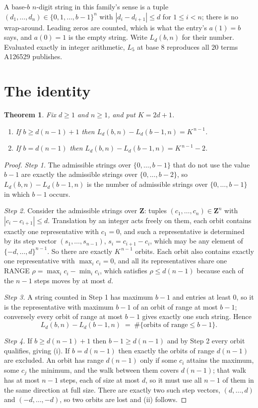 \documentclass[11pt,a4paper]{article}
\theoremstyle{plain}
\newtheorem{theorem}{Theorem}
\theoremstyle{definition}
\begin{document}
A base-$b$ $n$-digit string in this family's sense is a tuple
$(d_1,\dots,d_n)\in\{0,1,\dots,b-1\}^{n}$ with $|d_i-d_{i+1}|\le d$ for $1\le i<n$; there
is no wrap-around. Leading zeros are counted, which is what the entry's $a(1)=b$ says, and
$a(0)=1$ is the empty string. Write $L_d(b,n)$ for their number. Evaluated exactly in integer
arithmetic, $L_{5}$ at base $8$ reproduces all $20$ terms A126529 publishes.

\section{The identity}

\begin{theorem}
Fix $d\ge1$ and $n\ge1$, and put $K=2d+1$.
\begin{enumerate}
\item[(i)] If $b\ge d(n-1)+1$ then $L_d(b,n)-L_d(b-1,n)=K^{\,n-1}$.
\item[(ii)] If $b=d(n-1)$ then $L_d(b,n)-L_d(b-1,n)=K^{\,n-1}-2$.
\end{enumerate}
\end{theorem}

\begin{proof}
\emph{Step 1.} The admissible strings over $\{0,\dots,b-1\}$ that do not use the value $b-1$
are exactly the admissible strings over $\{0,\dots,b-2\}$, so $L_d(b,n)-L_d(b-1,n)$ is the
number of admissible strings over $\{0,\dots,b-1\}$ in which $b-1$ occurs.

\emph{Step 2.} Consider the admissible strings over $\mathbf{Z}$: tuples
$(c_1,\dots,c_n)\in\mathbf{Z}^{n}$ with $|c_i-c_{i+1}|\le d$. Translation by an integer acts
freely on them, each orbit contains exactly one representative with $c_1=0$, and such a
representative is determined by its step vector $(s_1,\dots,s_{n-1})$, $s_i=c_{i+1}-c_i$,
which may be any element of $\{-d,\dots,d\}^{n-1}$. So there are exactly $K^{\,n-1}$ orbits.
Each orbit also contains exactly one representative with $\max_i c_i=0$, and all its
representatives share one RANGE $\rho=\max_ic_i-\min_ic_i$, which satisfies
$\rho\le d(n-1)$ because each of the $n-1$ steps moves by at most $d$.

\emph{Step 3.} A string counted in Step 1 has maximum $b-1$ and entries at least $0$, so it is
the representative with maximum $b-1$ of an orbit of range at most $b-1$; conversely every orbit
of range at most $b-1$ gives exactly one such string. Hence
\[
L_d(b,n)-L_d(b-1,n)\;=\;\#\{\text{orbits of range}\le b-1\} .
\]

\emph{Step 4.} If $b\ge d(n-1)+1$ then $b-1\ge d(n-1)$ and by Step 2 every orbit qualifies,
giving (i). If $b=d(n-1)$ then exactly the orbits of range $d(n-1)$ are excluded. An orbit has
range $d(n-1)$ only if some $c_i$ attains the maximum, some $c_j$ the minimum, and the walk
between them covers $d(n-1)$; that walk has at most $n-1$ steps, each of size at most $d$, so it
must use all $n-1$ of them in the same direction at full size. There are exactly two such step
vectors, $(d,\dots,d)$ and $(-d,\dots,-d)$, so two orbits are lost and (ii) follows.
\end{proof}
\end{document}
